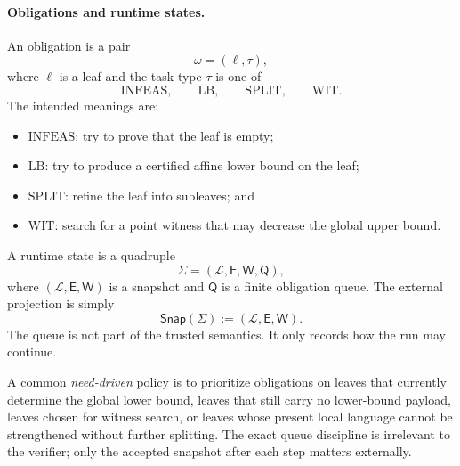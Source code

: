 \paragraph{Obligations and runtime states.}
An obligation is a pair
\[
\omega=(\ell,\tau),
\]
where $\ell$ is a leaf and the task type $\tau$ is one of
\[
\mathrm{INFEAS},\qquad \mathrm{LB},\qquad \mathrm{SPLIT},\qquad \mathrm{WIT}.
\]
The intended meanings are:
\begin{itemize}
    \item \(\mathrm{INFEAS}\): try to prove that the leaf is empty;
    \item \(\mathrm{LB}\): try to produce a certified affine lower bound on the leaf;
    \item \(\mathrm{SPLIT}\): refine the leaf into subleaves; and
    \item \(\mathrm{WIT}\): search for a point witness that may decrease the global upper bound.
\end{itemize}
A runtime state is a quadruple
\[
\Sigma=(\mathcal L,\mathsf E,\mathsf W,\mathsf Q),
\]
where $(\mathcal L,\mathsf E,\mathsf W)$ is a snapshot and $\mathsf Q$ is a finite obligation queue. The external projection is simply
\[
\mathsf{Snap}(\Sigma):=(\mathcal L,\mathsf E,\mathsf W).
\]
The queue is not part of the trusted semantics. It only records how the run may continue.

A common \emph{need-driven} policy is to prioritize obligations on leaves that currently determine the global lower bound, leaves that still carry no lower-bound payload, leaves chosen for witness search, or leaves whose present local language cannot be strengthened without further splitting. The exact queue discipline is irrelevant to the verifier; only the accepted snapshot after each step matters externally.

